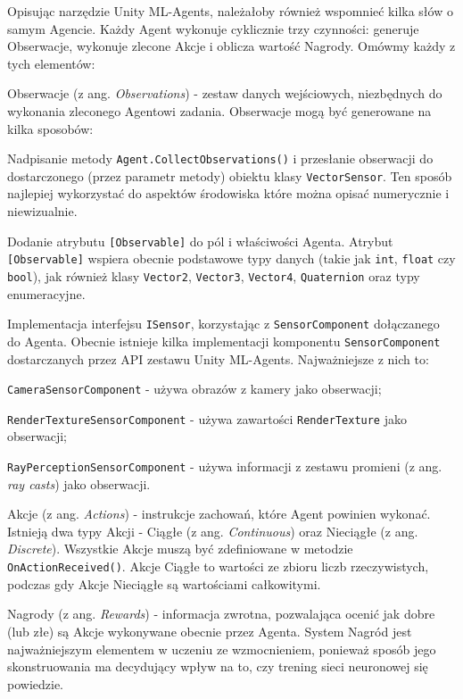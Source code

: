 Opisując narzędzie Unity ML-Agents, należałoby również wspomnieć kilka słów o samym Agencie. Każdy Agent wykonuje cyklicznie trzy czynności: generuje Obserwacje, wykonuje zlecone Akcje i oblicza wartość Nagrody. Omówmy każdy z tych elementów:
\begin{enumerate*}
\item Obserwacje (z ang. \textit{Observations}) - zestaw danych wejściowych, niezbędnych do wykonania zleconego Agentowi zadania. Obserwacje mogą być generowane na kilka sposobów:
\begin{itemize*}
\item Nadpisanie metody \texttt{Agent.CollectObservations()} i przesłanie obserwacji do dostarczonego (przez parametr metody) obiektu klasy \texttt{VectorSensor}. Ten sposób najlepiej wykorzystać do aspektów środowiska które można opisać numerycznie i niewizualnie.
\item Dodanie atrybutu \texttt{[Observable]} do pól i właściwości Agenta. Atrybut \\ \texttt{[Observable]} wspiera obecnie podstawowe typy danych (takie jak  \texttt{int}, \texttt{float} czy \texttt{bool}), jak również klasy \texttt{Vector2}, \texttt{Vector3}, \texttt{Vector4}, \texttt{Quaternion} oraz typy enumeracyjne.
\item Implementacja interfejsu \texttt{ISensor}, korzystając z \texttt{SensorComponent} dołączanego do Agenta. Obecnie istnieje kilka implementacji komponentu \texttt{SensorComponent} dostarczanych przez API zestawu Unity ML-Agents. Najważniejsze z nich to:
\begin{itemize*}
\item \texttt{CameraSensorComponent} - używa obrazów z kamery jako obserwacji;
\item \texttt{RenderTextureSensorComponent} - używa zawartości \texttt{RenderTexture} \cite{unity:renderTexture} jako obserwacji;
\item \texttt{RayPerceptionSensorComponent} - używa informacji z zestawu promieni (z ang. \textit{ray casts}) jako obserwacji.
\end{itemize*}
\end{itemize*}
\item Akcje (z ang. \textit{Actions}) - instrukcje zachowań, które Agent powinien wykonać. Istnieją dwa typy Akcji - Ciągłe (z ang. \textit{Continuous}) oraz Nieciągłe (z ang. \textit{Discrete}). Wszystkie Akcje muszą być zdefiniowane w metodzie \texttt{OnActionReceived()}. Akcje Ciągłe to wartości ze zbioru liczb rzeczywistych, podczas gdy Akcje Nieciągłe są wartościami całkowitymi.
\item Nagrody (z ang. \textit{Rewards}) - informacja zwrotna, pozwalająca ocenić jak dobre (lub złe) są Akcje wykonywane obecnie przez Agenta. System Nagród jest najważniejszym elementem w uczeniu ze wzmocnieniem, ponieważ sposób jego skonstruowania ma decydujący wpływ na to, czy trening sieci neuronowej się powiedzie.
\end{enumerate*}


